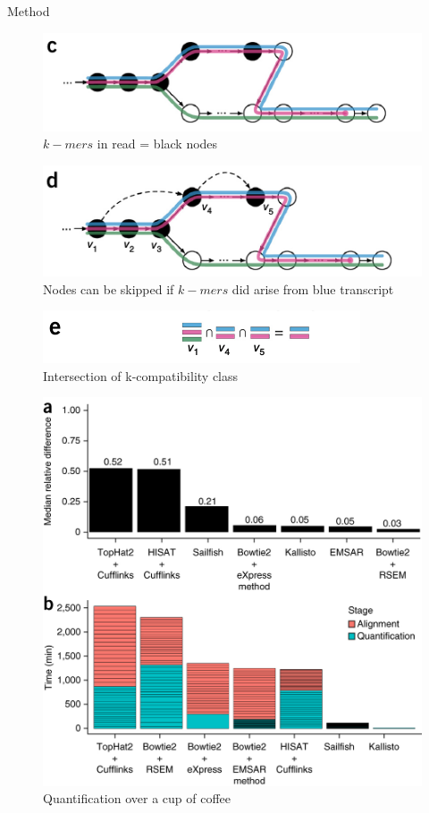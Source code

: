\documentclass[10pt]{beamer}
\begin{document}
\begin{frame}[allowframebreaks]{Method}
\begin{figure}
\includegraphics[width=\textwidth]{figc}
\caption{\footnotesize$k-mers$ in read = black nodes}
\end{figure}
\begin{figure}
\includegraphics[width=\textwidth]{figd}
\caption{\footnotesize Nodes can be skipped if $k-mers$ did arise from blue transcript}
\end{figure}
\begin{figure}
\includegraphics[width=\textwidth]{fige}
\caption{\footnotesize Intersection of k-compatibility class}
\end{figure}
\begin{figure}
\includegraphics[scale=0.2]{comparison}
\caption{\footnotesize Quantification over a cup of coffee}
\end{figure}

\end{frame}
\end{document}
